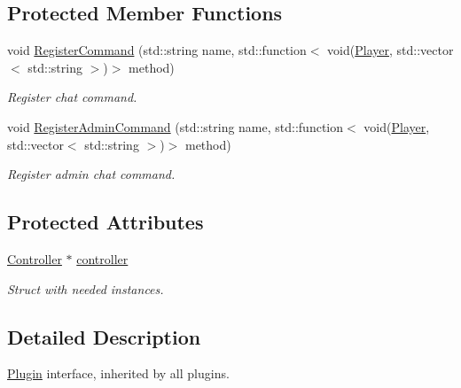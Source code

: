 \subsection*{Protected Member Functions}
\begin{DoxyCompactItemize}
\item 
void \hyperlink{classPlugin_a1f1b16c36188ef19f2f8d3a2fdc42578}{Register\-Command} (std\-::string name, std\-::function$<$ void(\hyperlink{structPlayer}{Player}, std\-::vector$<$ std\-::string $>$)$>$ method)
\begin{DoxyCompactList}\small\item\em Register chat command. \end{DoxyCompactList}\item 
void \hyperlink{classPlugin_a99eca8fe24acb076090e76a502f4c1ed}{Register\-Admin\-Command} (std\-::string name, std\-::function$<$ void(\hyperlink{structPlayer}{Player}, std\-::vector$<$ std\-::string $>$)$>$ method)
\begin{DoxyCompactList}\small\item\em Register admin chat command. \end{DoxyCompactList}\end{DoxyCompactItemize}
\subsection*{Protected Attributes}
\begin{DoxyCompactItemize}
\item 
\hypertarget{classPlugin_acd252bdd0b4050df6f221032d50acbe4}{\hyperlink{structController}{Controller} $\ast$ \hyperlink{classPlugin_acd252bdd0b4050df6f221032d50acbe4}{controller}}\label{classPlugin_acd252bdd0b4050df6f221032d50acbe4}

\begin{DoxyCompactList}\small\item\em Struct with needed instances. \end{DoxyCompactList}\end{DoxyCompactItemize}


\subsection{Detailed Description}
\hyperlink{classPlugin}{Plugin} interface, inherited by all plugins. 

